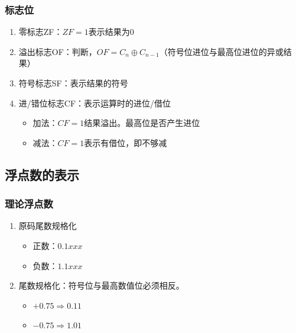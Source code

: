 \documentclass[./computer-organization-and-architecture.tex]{subfiles}
\begin{document}
    \subsubsection{标志位}

    \begin{enumerate}
        \item 零标志ZF：$ZF = 1$表示结果为0
        \item 溢出标志OF：判断{\color{blue}{有符号数}}，$OF = C_n\oplus C_{n-1}$（符号位进位与最高位进位的异或结果）
        \item 符号标志SF：表示结果的符号
        \item 进/错位标志CF：表示{\color{blue}{无符号数}}运算时的进位/借位
        \begin{itemize}
            \item 加法：$CF = 1$结果溢出。最高位是否产生进位
            \item 减法：$CF = 1$表示有借位，即不够减
        \end{itemize}
    \end{enumerate}

    \subsection{浮点数的表示}

    \subsubsection{理论浮点数}

    \begin{enumerate}
        \item 原码尾数规格化
        \begin{itemize}
            \item 正数：$0.1xxx$
            \item 负数：$1.1xxx$
        \end{itemize}
        \item {\color{red}{补码}}尾数规格化：符号位与最高数值位必须相反。
        \begin{itemize}
            \item $+0.75 \Rightarrow 0.11$
            \item $-0.75 \Rightarrow 1.01$
        \end{itemize}
    \end{enumerate}
\end{document}
